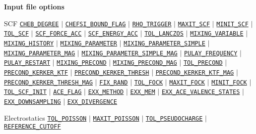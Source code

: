 \begin{frame}[allowframebreaks]{\textbf{Input file options}}
\begin{block}{SCF}
\hyperlink{CHEB_DEGREE}{\texttt{CHEB\_DEGREE}} $\vert$
\hyperlink{CHEFSI_BOUND_FLAG}{\texttt{CHEFSI\_BOUND\_FLAG}} $\vert$
\hyperlink{RHO_TRIGGER}{\texttt{RHO\_TRIGGER}} $\vert$
\hyperlink{MAXIT_SCF}{\texttt{MAXIT\_SCF}} $\vert$
\hyperlink{MINIT_SCF}{\texttt{MINIT\_SCF}} $\vert$
\hyperlink{TOL_SCF}{\texttt{TOL\_SCF}} $\vert$
\hyperlink{SCF_FORCE_ACC}{\texttt{SCF\_FORCE\_ACC}} $\vert$
\hyperlink{SCF_ENERGY_ACC}{\texttt{SCF\_ENERGY\_ACC}} $\vert$
\hyperlink{TOL_LANCZOS}{\texttt{TOL\_LANCZOS}} $\vert$
\hyperlink{MIXING_VARIABLE}{\texttt{MIXING\_VARIABLE}} $\vert$
\hyperlink{MIXING_HISTORY}{\texttt{MIXING\_HISTORY}} $\vert$
\hyperlink{MIXING_PARAMETER}{\texttt{MIXING\_PARAMETER}} $\vert$
\hyperlink{MIXING_PARAMETER_SIMPLE}{\texttt{MIXING\_PARAMETER\_SIMPLE}} $\vert$
\hyperlink{MIXING_PARAMETER_MAG}{\texttt{MIXING\_PARAMETER\_MAG}} $\vert$
\hyperlink{MIXING_PARAMETER_SIMPLE_MAG}{\texttt{MIXING\_PARAMETER\_SIMPLE\_MAG}} $\vert$
\hyperlink{PULAY_FREQUENCY}{\texttt{PULAY\_FREQUENCY}} $\vert$
\hyperlink{PULAY_RESTART}{\texttt{PULAY\_RESTART}} $\vert$
\hyperlink{MIXING_PRECOND}{\texttt{MIXING\_PRECOND}} $\vert$
\hyperlink{MIXING_PRECOND_MAG}{\texttt{MIXING\_PRECOND\_MAG}} $\vert$
\hyperlink{TOL_PRECOND}{\texttt{TOL\_PRECOND}} $\vert$
\hyperlink{PRECOND_KERKER_KTF}{\texttt{PRECOND\_KERKER\_KTF}} $\vert$
\hyperlink{PRECOND_KERKER_THRESH}{\texttt{PRECOND\_KERKER\_THRESH}} $\vert$
\hyperlink{PRECOND_KERKER_KTF_MAG}{\texttt{PRECOND\_KERKER\_KTF\_MAG}} $\vert$
\hyperlink{PRECOND_KERKER_THRESH_MAG}{\texttt{PRECOND\_KERKER\_THRESH\_MAG}} $\vert$
\hyperlink{FIX_RAND}{\texttt{FIX\_RAND}} $\vert$ 
\hyperlink{TOL_FOCK}{\texttt{TOL\_FOCK}} $\vert$ 
\hyperlink{MAXIT_FOCK}{\texttt{MAXIT\_FOCK}} $\vert$ 
\hyperlink{MINIT_FOCK}{\texttt{MINIT\_FOCK}} $\vert$ 
\hyperlink{TOL_SCF_INIT}{\texttt{TOL\_SCF\_INIT}} $\vert$ 
\hyperlink{ACE_FLAG}{\texttt{ACE\_FLAG}} $\vert$ 
\hyperlink{EXX_METHOD}{\texttt{EXX\_METHOD}} $\vert$ 
\hyperlink{EXX_MEM}{\texttt{EXX\_MEM}} $\vert$ 
\hyperlink{EXX_ACE_VALENCE_STATES}{\texttt{EXX\_ACE\_VALENCE\_STATES}} $\vert$ 
\hyperlink{EXX_DOWNSAMPLING}{\texttt{EXX\_DOWNSAMPLING}} $\vert$ 
\hyperlink{EXX_DIVERGENCE}{\texttt{EXX\_DIVERGENCE}}
\end{block}

\vspace{-2mm}
\begin{block}{Electrostatics}
\hyperlink{TOL_POISSON}{\texttt{TOL\_POISSON}} $\vert$
\hyperlink{MAXIT_POISSON}{\texttt{MAXIT\_POISSON}} $\vert$
\hyperlink{TOL_PSEUDOCHARGE}{\texttt{TOL\_PSEUDOCHARGE}} $\vert$
\hyperlink{REFERENCE_CUTOFF}{\texttt{REFERENCE\_CUTOFF}} 
\end{block}


\end{frame}
